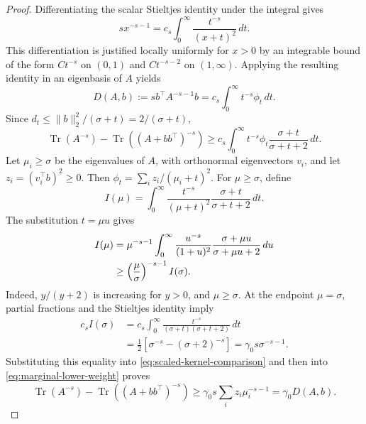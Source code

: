 \documentclass[conference]{IEEEtran}
\theoremstyle{definition}
\DeclareMathOperator{\Tr}{Tr}
\begin{document}
\begin{proof}
Differentiating the scalar Stieltjes identity under the integral gives
\[
 sx^{-s-1}=c_s\int_0^\infty
                       \frac{t^{-s}}{(x+t)^2}\,dt.
\]
This differentiation is justified locally uniformly for $x>0$ by an
integrable bound of the form $Ct^{-s}$ on $(0,1)$ and
$Ct^{-s-2}$ on $(1,\infty)$.
Applying the resulting identity in an eigenbasis of $A$ yields
\begin{equation}
 D(A,b):=s b^\top A^{-s-1}b
       =c_s\int_0^\infty{ t}^{-s}{\phi}_t\,dt.
 \label{eq:initial-directional-gain}
\end{equation}
Since $d_t\leq\|b\|_2^2/(\sigma+t)=2/(\sigma+t)$,
\begin{equation}
 \Tr(A^{-s})-\Tr((A+bb^\top)^{-s})
 \geq c_s\int_0^\infty{ t}^{-s}{\phi}_t
                       \frac{\sigma+t}{\sigma+t+2}\,dt.
 \label{eq:marginal-lower-weight}
\end{equation}
Let $\mu_i\geq\sigma$ be the eigenvalues of $A$, with orthonormal
eigenvectors $v_i$, and let $z_i=(v_i^\top b)^2\geq0$.
Then ${\phi}_t=\sum_i z_i/(\mu_i+t)^2$.
For $\mu\geq\sigma$, define
\[
 I(\mu)=\int_0^\infty
  \frac{t^{-s}}{(\mu+t)^2}
  \frac{\sigma+t}{\sigma+t+2}\,dt.
\]
The substitution $t=\mu u$ gives
\begin{align}
 I(\mu)
 &=\mu^{-s-1}\int_0^\infty
   \frac{u^{-s}}{(1+u)^2}
   \frac{\sigma+\mu u}{\sigma+\mu u+2}\,du\notag\\
 &\geq\left(\frac{\mu}{\sigma}\right)^{-s-1}I(\sigma).
 \label{eq:scaled-kernel-comparison}
\end{align}
Indeed, $y/(y+2)$ is increasing for $y>0$, and $\mu\geq\sigma$.
At the endpoint $\mu=\sigma$, partial fractions and the Stieltjes
identity imply
\begin{align*}
 c_s I(\sigma)
 &=c_s\int_0^\infty
   \frac{t^{-s}}{(\sigma+t)(\sigma+t+2)}\,dt\\
 &=\frac12\left[\sigma^{-s}-(\sigma+2)^{-s}\right]
 =\gamma_0s\sigma^{-s-1}.
\end{align*}
Substituting this equality into \eqref{eq:scaled-kernel-comparison}
and then into \eqref{eq:marginal-lower-weight} proves
\begin{equation}
 \Tr(A^{-s})-\Tr((A+bb^\top)^{-s})
 \geq\gamma_0s\sum_i z_i\mu_i^{-s-1}
 =\gamma_0D(A,b).
 \label{eq:single-versus-derivative}
\end{equation}


\end{proof}
\end{document}
